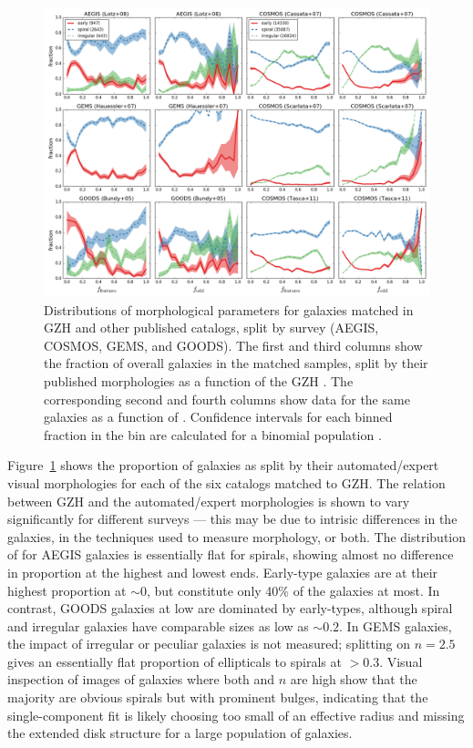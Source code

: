 \documentclass[twocolumn]{aastex6}
\begin{document}
\begin{figure}
\center
\includegraphics[width=1.0\textwidth]{figures/comparisons.png}
\caption{Distributions of morphological parameters for galaxies matched in GZH and other published catalogs, split by survey (AEGIS, COSMOS, GEMS, and GOODS). The first and third columns show the fraction of overall galaxies in the matched samples, split by their published morphologies as a function of the GZH \fbest. The corresponding second and fourth columns show data for the same galaxies as a function of \fodd. Confidence intervals for each binned fraction in the bin are calculated for a binomial population \citep{cam11}.}
\label{fig:comparisons}
\end{figure}

Figure~\ref{fig:comparisons} shows the proportion of galaxies as split by their automated/expert visual morphologies for each of the six catalogs matched to GZH. The relation between GZH and the automated/expert morphologies is shown to vary significantly for different surveys --- this may be due to intrisic differences in the galaxies, in the techniques used to measure morphology, or both. The distribution of \fbest{} for AEGIS galaxies is essentially flat for spirals, showing almost no difference in proportion at the highest and lowest ends. Early-type galaxies are at their highest proportion at \fbest$\sim0$, but constitute only 40\% of the galaxies at most. In contrast, GOODS galaxies at low \fbest{} are dominated by early-types, although spiral and irregular galaxies have comparable sizes as low as \fbest$\sim0.2$. In GEMS galaxies, the impact of irregular or peculiar galaxies is not measured; splitting on $n=2.5$ gives an essentially flat proportion of ellipticals to spirals at \fbest$>0.3$. Visual inspection of images of galaxies where both \fbest{} and $n$ are high show that the majority are obvious spirals but with prominent bulges, indicating that the single-component \sersic{} fit is likely choosing too small of an effective radius and missing the extended disk structure for a large population of galaxies. 
\end{document}
